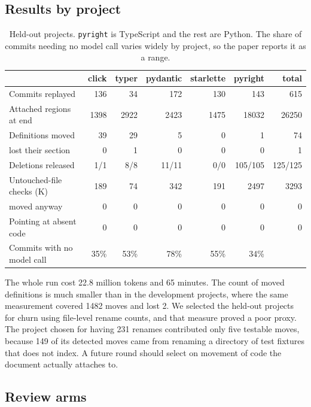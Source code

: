 \subsection{Results by project}
\label{app:attachment-results}

\begin{table}[h]
\centering
\small
\begin{tabular}{lrrrrrr}
\toprule
 & click & typer & pydantic & starlette & pyright & total \\
\midrule
Commits replayed & 136 & 34 & 172 & 130 & 143 & 615 \\
Attached regions at end & 1398 & 2922 & 2423 & 1475 & 18032 & 26250 \\
\midrule
Definitions moved & 39 & 29 & 5 & 0 & 1 & 74 \\
\quad lost their section & 0 & 1 & 0 & 0 & 0 & 1 \\
Deletions released & 1/1 & 8/8 & 11/11 & 0/0 & 105/105 & 125/125 \\
Untouched-file checks (K) & 189 & 74 & 342 & 191 & 2497 & 3293 \\
\quad moved anyway & 0 & 0 & 0 & 0 & 0 & 0 \\
Pointing at absent code & 0 & 0 & 0 & 0 & 0 & 0 \\
\midrule
Commits with no model call & 35\% & 53\% & 78\% & 55\% & 34\% & \\
\bottomrule
\end{tabular}
\caption{Held-out projects. \texttt{pyright} is TypeScript and the rest are Python. The share of commits needing no model call varies widely by project, so the paper reports it as a range.}
\label{tab:attachment-per-project}
\end{table}

The whole run cost 22.8 million tokens and 65 minutes. The count of moved definitions is much smaller than in the development projects, where the same measurement covered 1482 moves and lost 2. We selected the held-out projects for churn using file-level rename counts, and that measure proved a poor proxy. The project chosen for having 231 renames contributed only five testable moves, because 149 of its detected moves came from renaming a directory of test fixtures that \sys{} does not index. A future round should select on movement of code the document actually attaches to.

\subsection{Review arms}
\label{app:attachment-arms}

